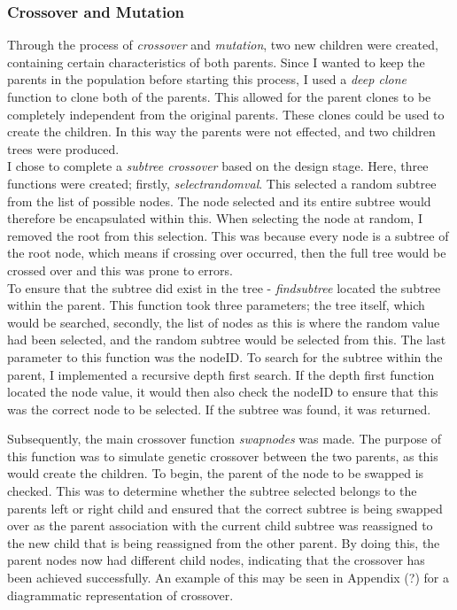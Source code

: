 \documentclass[11pt]{article}
\begin{document}
\subsubsection{Crossover and Mutation}\label{subsubsec:CM}
Through the process of \textit{crossover} and \textit{mutation}, two new children were created, containing certain characteristics of both parents. Since I wanted to keep the parents in the population before starting this process, I used a \textit{deep clone} function to clone both of the parents. This allowed for the parent clones to be completely independent from the original parents. These clones could be used to create the children. In this way the parents were not effected, and two children trees were produced. 
\\
I chose to complete a \textit{subtree crossover} based on the design stage. Here, three functions were created; firstly, \textit{select\textunderscore random\textunderscore val}. This selected a random subtree from the list of possible nodes. The node selected and its entire subtree would therefore be encapsulated within this. When selecting the node at random, I removed the root from this selection. This was because every node is a subtree of the root node, which means if crossing over occurred, then the full tree would be crossed over and this was prone to errors. \\

To ensure that the subtree did exist in the tree - \textit{find\textunderscore subtree} located the subtree within the parent. This function took three parameters; the tree itself, which would be searched, secondly, the list of nodes as this is where the random value had been selected, and the random subtree would be selected from this. The last parameter to this function was the nodeID. To search for the subtree within the parent, I implemented a recursive depth first search. If the depth first function located the node value, it would then also check the nodeID to ensure that this was the correct node to be selected. If the subtree was found, it was returned.

Subsequently, the main crossover function \textit{swap\textunderscore nodes} was made. The purpose of this function was to simulate genetic crossover between the two parents, as this would create the children. To begin, the parent of the node to be swapped is checked. This was to determine whether the subtree selected belongs to the parents left or right child and ensured that the correct subtree is being swapped over as the parent association with the current child subtree was reassigned to the new child that is being reassigned from the other parent. By doing this, the parent nodes now had different child nodes, indicating that the crossover has been achieved successfully. An example of this may be seen in Appendix (?) for a diagrammatic representation of crossover. 
\end{document}
